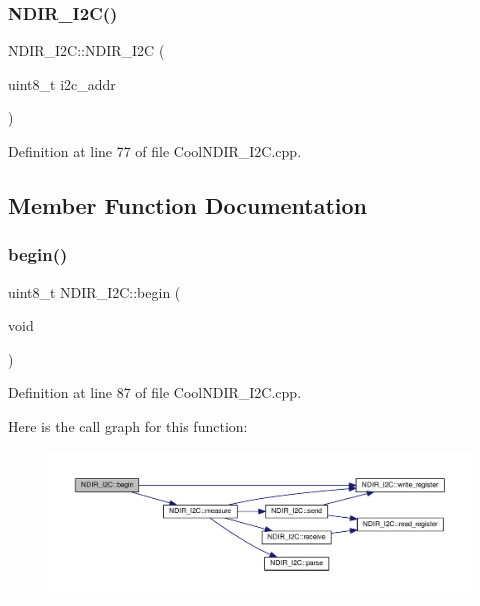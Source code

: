 \subsubsection{\texorpdfstring{N\+D\+I\+R\+\_\+\+I2\+C()}{NDIR\_I2C()}}
{\footnotesize\ttfamily N\+D\+I\+R\+\_\+\+I2\+C\+::\+N\+D\+I\+R\+\_\+\+I2C (\begin{DoxyParamCaption}\item[{uint8\+\_\+t}]{i2c\+\_\+addr }\end{DoxyParamCaption})}



Definition at line 77 of file Cool\+N\+D\+I\+R\+\_\+\+I2\+C.\+cpp.



\subsection{Member Function Documentation}
\mbox{\label{class_n_d_i_r___i2_c_acf82f3dcb41e75709a93f8b68d087a3c}} 
\subsubsection{\texorpdfstring{begin()}{begin()}}
{\footnotesize\ttfamily uint8\+\_\+t N\+D\+I\+R\+\_\+\+I2\+C\+::begin (\begin{DoxyParamCaption}\item[{void}]{ }\end{DoxyParamCaption})}



Definition at line 87 of file Cool\+N\+D\+I\+R\+\_\+\+I2\+C.\+cpp.

Here is the call graph for this function\+:
\nopagebreak
\begin{figure}[H]
\begin{center}
\leavevmode
\includegraphics[width=350pt]{class_n_d_i_r___i2_c_acf82f3dcb41e75709a93f8b68d087a3c_cgraph}
\end{center}
\end{figure}
\mbox{\label{class_n_d_i_r___i2_c_ab8f50d38501d498b802b822bd4844ede}} 
